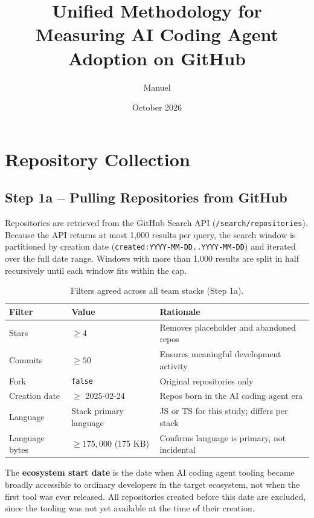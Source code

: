 \documentclass[11pt, a4paper]{article}
\title{\textbf{Unified Methodology for Measuring AI Coding Agent Adoption on GitHub}}
\author{Manuel}
\date{October 2026}
\begin{document}
\maketitle
\thispagestyle{fancy}


\section{Repository Collection}

\subsection*{Step 1a -- Pulling Repositories from GitHub}

Repositories are retrieved from the GitHub Search API
(\texttt{/search/repositories}).
Because the API returns at most 1,000 results per query, the search window is
partitioned by creation date (\texttt{created:YYYY-MM-DD..YYYY-MM-DD}) and
iterated over the full date range. Windows with more than 1,000 results are
split in half recursively until each window fits within the cap.

\begin{table}[h]
\centering
\caption{Filters agreed across all team stacks (Step 1a).}
\begin{tabular}{@{}lll@{}}
\toprule
\textbf{Filter} & \textbf{Value} & \textbf{Rationale} \\
\midrule
Stars            & $\geq 4$              & Removes placeholder and abandoned repos \\
Commits          & $\geq 50$             & Ensures meaningful development activity \\
Fork             & \texttt{false}        & Original repositories only \\
Creation date    & $\geq$ 2025-02-24     & Repos born in the AI coding agent era \\
Language         & Stack primary language & JS or TS for this study; differs per stack \\
Language bytes   & $\geq 175{,}000$ (175 KB) & Confirms language is primary, not incidental \\
\bottomrule
\end{tabular}
\end{table}

The \textbf{ecosystem start date} is the date when AI coding agent tooling
became broadly accessible to ordinary developers in the target ecosystem, not
when the first tool was ever released. All repositories created before this
date are excluded, since the tooling was not yet available at the time of
their creation.
\end{document}
